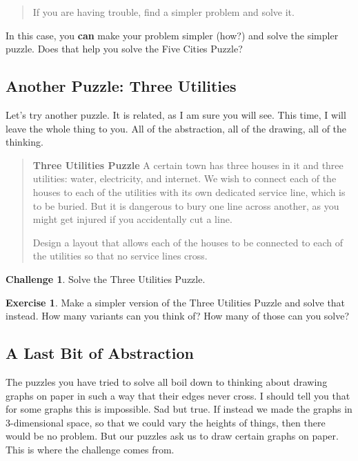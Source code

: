 \documentclass[12pt,letterpaper]{article}
\theoremstyle{definition}
\newtheorem{exercise}[question]{Exercise}
\newtheorem*{challenge}{Challenge}
\begin{document}
\begin{quotation} If you are having trouble, find a simpler problem and solve it. 
\end{quotation}

In this case, you \textbf{can} make your problem simpler (how?) and solve the simpler puzzle. Does that help you
solve the Five Cities Puzzle?

\subsection*{Another Puzzle: Three Utilities}

Let's try another puzzle. It is related, as I am sure you will see. This time, I will leave the whole thing to you. All of the abstraction, all of the drawing, all of the thinking.

\begin{quotation}\textbf{Three Utilities Puzzle} A certain town has three houses in it and three utilities: water, 
electricity, and internet. We wish to connect each of the houses to each of the utilities with its own dedicated service 
line, which is to be buried. But it is dangerous to bury one line across another, as you might get injured if you accidentally cut a line. 

Design a layout that allows each of the houses to be connected to each of the utilities so that no service lines cross.
\end{quotation}

\begin{challenge}
Solve the Three Utilities Puzzle.
\end{challenge}

\begin{exercise}
Make a simpler version of the Three Utilities Puzzle and solve that instead. How many variants can you think of? How many of those can you solve?
\end{exercise}


\clearpage

\subsection*{A Last Bit of Abstraction}

The puzzles you have tried to solve all boil down to thinking about drawing graphs on paper in such a way that their
edges never cross. I should tell you that for some graphs this is impossible. Sad but true. If instead we made the graphs in 3-dimensional space, so that we could vary the heights of things, then there would be no problem. But our puzzles ask us to draw certain graphs on paper. This is where the challenge comes from.
\end{document}
